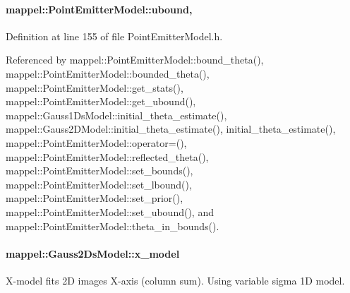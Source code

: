 \paragraph[{\texorpdfstring{ubound}{ubound}}]{ mappel\+::\+Point\+Emitter\+Model\+::ubound\hspace{0.3cm}{\ttfamily [protected]}, {\ttfamily [inherited]}}\hypertarget{classmappel_1_1PointEmitterModel_a35b883e84b6a2e0093bdf482c623beef}{}\label{classmappel_1_1PointEmitterModel_a35b883e84b6a2e0093bdf482c623beef}


Definition at line 155 of file Point\+Emitter\+Model.\+h.



Referenced by mappel\+::\+Point\+Emitter\+Model\+::bound\+\_\+theta(), mappel\+::\+Point\+Emitter\+Model\+::bounded\+\_\+theta(), mappel\+::\+Point\+Emitter\+Model\+::get\+\_\+stats(), mappel\+::\+Point\+Emitter\+Model\+::get\+\_\+ubound(), mappel\+::\+Gauss1\+Ds\+Model\+::initial\+\_\+theta\+\_\+estimate(), mappel\+::\+Gauss2\+D\+Model\+::initial\+\_\+theta\+\_\+estimate(), initial\+\_\+theta\+\_\+estimate(), mappel\+::\+Point\+Emitter\+Model\+::operator=(), mappel\+::\+Point\+Emitter\+Model\+::reflected\+\_\+theta(), mappel\+::\+Point\+Emitter\+Model\+::set\+\_\+bounds(), mappel\+::\+Point\+Emitter\+Model\+::set\+\_\+lbound(), mappel\+::\+Point\+Emitter\+Model\+::set\+\_\+prior(), mappel\+::\+Point\+Emitter\+Model\+::set\+\_\+ubound(), and mappel\+::\+Point\+Emitter\+Model\+::theta\+\_\+in\+\_\+bounds().

\paragraph[{\texorpdfstring{x\+\_\+model}{x_model}}]{ mappel\+::\+Gauss2\+Ds\+Model\+::x\+\_\+model\hspace{0.3cm}{\ttfamily [protected]}}\hypertarget{classmappel_1_1Gauss2DsModel_ab2b2238d5213b2de85897bc60d5dcc4d}{}\label{classmappel_1_1Gauss2DsModel_ab2b2238d5213b2de85897bc60d5dcc4d}
X-\/model fits 2D images X-\/axis (column sum). Using variable sigma 1D model. 

